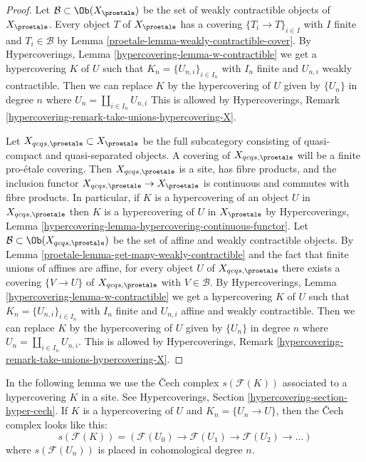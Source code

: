 \begin{proof}

Let $\mathcal{B} \subset \Ob(X_\proetale)$ be the set of weakly contractible
objects of $X_\proetale$. Every object $T$ of $X_\proetale$ has a
covering $\{T_i \to T\}_{i \in I}$ with $I$ finite and $T_i \in \mathcal{B}$ by
Lemma \ref{proetale-lemma-weakly-contractible-cover}.
By Hypercoverings, Lemma \ref{hypercovering-lemma-w-contractible}
we get a hypercovering $K$ of $U$ such that $K_n = \{U_{n, i}\}_{i \in I_n}$
with $I_n$ finite and $U_{n, i}$ weakly contractible.
Then we can replace $K$ by the hypercovering of $U$ given by $\{U_n\}$
in degree $n$ where $U_n = \coprod_{i \in I_n} U_{n, i}$
This is allowed by
Hypercoverings, Remark \ref{hypercovering-remark-take-unions-hypercovering-X}.

\medskip\noindent
Let $X_{qcqs, \proetale} \subset X_\proetale$ be the full subcategory
consisting of quasi-compact and quasi-separated objects.
A covering of $X_{qcqs, \proetale}$ will be a finite pro-\'etale covering.
Then $X_{qcqs, \proetale}$ is a site, has fibre products, and
the inclusion functor $X_{qcqs, \proetale} \to X_\proetale$ is continuous
and commutes with fibre products.
In particular, if $K$ is a hypercovering of an object $U$ in
$X_{qcqs, \proetale}$ then $K$ is a hypercovering of $U$ in $X_\proetale$
by Hypercoverings, Lemma
\ref{hypercovering-lemma-hypercovering-continuous-functor}.
Let $\mathcal{B} \subset \Ob(X_{qcqs, \proetale})$ be the set of
affine and weakly contractible objects. By
Lemma \ref{proetale-lemma-get-many-weakly-contractible}
and the fact that finite unions of affines are affine,
for every object $U$ of $X_{qcqs, \proetale}$ there exists a covering
$\{V \to U\}$ of $X_{qcqs, \proetale}$ with $V \in \mathcal{B}$.
By Hypercoverings, Lemma \ref{hypercovering-lemma-w-contractible}
we get a hypercovering $K$ of $U$ such that $K_n = \{U_{n, i}\}_{i \in I_n}$
with $I_n$ finite and $U_{n, i}$ affine and weakly contractible.
Then we can replace $K$ by the hypercovering of $U$
given by $\{U_n\}$ in degree $n$ where
$U_n = \coprod_{i \in I_n} U_{n, i}$. This is allowed by
Hypercoverings, Remark \ref{hypercovering-remark-take-unions-hypercovering-X}.
\end{proof}

In the following lemma we use the {\v C}ech complex $s(\mathcal{F}(K))$
associated to a hypercovering $K$ in a site. See
Hypercoverings, Section \ref{hypercovering-section-hyper-cech}.
If $K$ is a hypercovering of $U$ and $K_n = \{U_n \to U\}$, then
the {\v C}ech complex looks like this:
$$
s(\mathcal{F}(K)) =
\left(
\mathcal{F}(U_0) \to \mathcal{F}(U_1) \to \mathcal{F}(U_2) \to \ldots
\right)
$$
where $s(\mathcal{F}(U_n))$ is placed in cohomological degree $n$.


